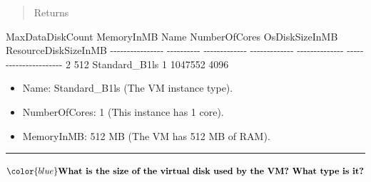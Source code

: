 \documentclass[11pt]{article}
\providecommand{\tightlist}{%
      \setlength{\itemsep}{0pt}\setlength{\parskip}{0pt}}
\newenvironment{Shaded}{}{}
\newcommand{\DataTypeTok}[1]{\textcolor[rgb]{0.56,0.13,0.00}{{#1}}}
\newcommand{\DecValTok}[1]{\textcolor[rgb]{0.25,0.63,0.44}{{#1}}}
\newcommand{\StringTok}[1]{\textcolor[rgb]{0.25,0.44,0.63}{{#1}}}
\newcommand{\NormalTok}[1]{{#1}}
\newcommand{\VariableTok}[1]{\textcolor[rgb]{0.10,0.09,0.49}{{#1}}}
\newcommand{\OperatorTok}[1]{\textcolor[rgb]{0.40,0.40,0.40}{{#1}}}
\newcommand{\ExtensionTok}[1]{{#1}}
\newcommand{\AttributeTok}[1]{\textcolor[rgb]{0.49,0.56,0.16}{{#1}}}
\begin{document}
\begin{Shaded}
\end{Shaded}

\begin{quote}
Returns
\end{quote}

\begin{Shaded}
\begin{Highlighting}[]
\NormalTok{MaxDataDiskCount  MemoryInMB  Name           NumberOfCores  OsDiskSizeInMB  ResourceDiskSizeInMB}
\OperatorTok{{-}{-}{-}{-}{-}{-}{-}{-}{-}{-}{-}{-}{-}{-}{-}{-}}  \OperatorTok{{-}{-}{-}{-}{-}{-}{-}{-}{-}{-}}  \OperatorTok{{-}{-}{-}{-}{-}{-}{-}{-}{-}{-}{-}{-}{-}}  \OperatorTok{{-}{-}{-}{-}{-}{-}{-}{-}{-}{-}{-}{-}{-}}  \OperatorTok{{-}{-}{-}{-}{-}{-}{-}{-}{-}{-}{-}{-}{-}{-}}  \OperatorTok{{-}{-}{-}{-}{-}{-}{-}{-}{-}{-}{-}{-}{-}{-}{-}{-}{-}{-}{-}{-}{-}{-}}
\DecValTok{2}                 \DecValTok{512}\NormalTok{         Standard\_B1ls  }\DecValTok{1}              \DecValTok{1047552}         \DecValTok{4096}
\end{Highlighting}
\end{Shaded}

\begin{itemize}
\tightlist
\item
  Name: Standard\_B1ls (The VM instance type).
\item
  NumberOfCores: 1 (This instance has 1 core).
\item
  MemoryInMB: 512 MB (The VM has 512 MB of RAM).
\end{itemize}

\begin{center}\rule{0.5\linewidth}{0.5pt}\end{center}

\(\color{blue}\textbf{What is the size of the virtual disk used by the VM? What type is it?}\)
\end{document}

